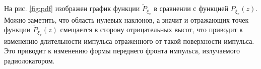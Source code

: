 На рис. \ref{fig:pdf} изображен график функции $\tilde P_{\xi_x}$ в сравнении с
функцией $P_{\xi_x}(z)$. Можно заметить, что область нулевых наклонов, а значит
и отражающих точек функции $\tilde P_{\xi_x}(z)$ смещается в сторону
отрицательных высот, что приводит к изменению длительности импульса отраженного
от такой поверхности импульса. 
Это приводит к изменению формы переднего фронта импульса, излучаемого
радиолокатором. 

